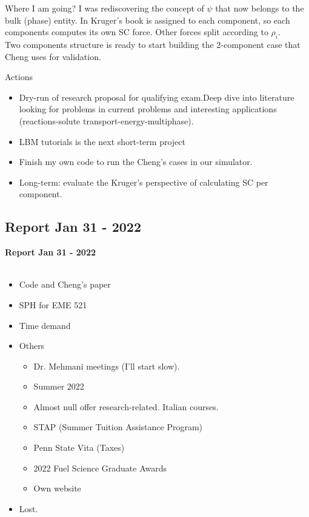 \documentclass{beamer}
\begin{document}
	\begin{frame}{Where I am going?}
		I was rediscovering the concept of $\psi$ that now belongs to the bulk (phase) entity. In Kruger's book is assigned to each component, so each components computes its own SC force. Other forces split according to $\rho_i$.\\
		Two components structure is ready to start building the 2-component case that Cheng uses for validation. 
	\end{frame}
	\begin{frame}{Actions}
		\begin{itemize}
			\item Dry-run of research proposal for qualifying exam.Deep dive into literature looking for problems in current problems and interesting applications (reactions-solute transport-energy-multiphase).
			\item LBM tutorials is the next short-term project
			\item Finish my own code to run the Cheng's cases in our simulator. 
			\item Long-term: evaluate the Kruger's perspective of calculating SC per component.
		\end{itemize}
	\end{frame}
	
	\subsection{Report Jan 31 - 2022}
	\label{}
	\justifying
	\begin{frame}
		\textbf{Report Jan 31 - 2022}\\~\\
		\begin{itemize}
			\item Code and Cheng's paper
			\item SPH for EME 521
			\item Time demand
			\item Others
			\begin{itemize}
				\item Dr. Mehmani meetings (I'll start slow). 
				\item Summer 2022
				\item Almost null offer research-related. Italian courses.
				\item STAP (Summer Tuition Assistance Program)
				\item Penn State Vita (Taxes)
				\item 2022 Fuel Science Graduate Awards
				\item Own website
			\end{itemize}
			\item Lost.
		\end{itemize}
	\end{frame}
	
\end{document}
